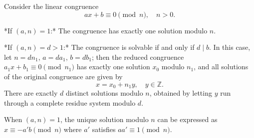 Consider the linear congruence
$$ax + b \equiv 0 \pmod{n}, \quad n > 0.$$

*If $(a, n) = 1$:* The congruence has exactly one solution modulo $n$.

*If $(a, n) = d > 1$:* The congruence is solvable if and only if $d \mid b$. In this case, let $n = d n_1$, $a = d a_1$, $b = d b_1$; then the reduced congruence $a_1 x + b_1 \equiv 0 \pmod{n_1}$ has exactly one solution $x_0$ modulo $n_1$, and all solutions of the original congruence are given by
$$x = x_0 + n_1 y, \quad y \in \mathbb{Z}.$$
There are exactly $d$ distinct solutions modulo $n$, obtained by letting $y$ run through a complete residue system modulo $d$.

When $(a, n) = 1$, the unique solution modulo $n$ can be expressed as $x \equiv -a' b \pmod{n}$ where $a'$ satisfies $a a' \equiv 1 \pmod{n}$.

